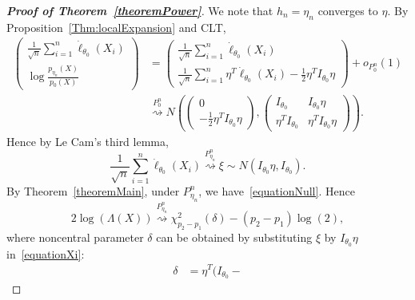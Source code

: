 \documentclass[3p]{elsarticle}
\theoremstyle{plain}
\theoremstyle{definition}
\theoremstyle{remark}
\begin{document}
\begin{proof}[\textbf{Proof of Theorem~\ref{theoremPower}}]
    We note that $h_n=\eta_n$ converges to $\eta$. By Proposition~\ref{Thm:localExpansion} and CLT,
\begin{equation}
    \begin{aligned}
    \left(
    \begin{matrix}
        \frac{1}{\sqrt{n}}\sum^n_{i=1}\dot{\ell}_{\theta_0}(X_i)
        \\
        \log \frac{p_{\eta_n}(X)}{p_0(X)}
    \end{matrix}
    \right)
    &=\left(
        \begin{matrix}
        \frac{1}{\sqrt{n}}\sum^n_{i=1}\dot{\ell}_{\theta_0}(X_i)
        \\
        \frac{1}{\sqrt{n}}\sum^n_{i=1}\eta^T\dot{\ell}_{\theta_0}(X_i)-\frac{1}{2}\eta^T I_{\theta_0}\eta
        \end{matrix}
    \right)
    +o_{P_0^n}(1)\\
    &\overset{P_0^n}{\rightsquigarrow}
    N(
    \left(
    \begin{matrix}
        0\\
        -\frac{1}{2}\eta^T I_{\theta_0}\eta
    \end{matrix}
    \right),
    \left(
        \begin{matrix}
            I_{\theta_0}&I_{\theta_0}\eta\\
            \eta^T I_{\theta_0}&\eta^T I_{\theta_0}\eta
        \end{matrix}
    \right)
    ).
    \end{aligned}
\end{equation}
Hence by Le Cam's third lemma,
\begin{equation}
    \frac{1}{\sqrt{n}}\sum^n_{i=1}\dot{\ell}_{\theta_0}(X_i)\overset{P^n_{\eta_n}}{\rightsquigarrow}\xi\sim N(I_{\theta_0}\eta,I_{\theta_0}).
\end{equation}
By Theorem~\ref{theoremMain}, under $P_{\eta_n}^n$, we have~\eqref{equationNull}.
Hence
\begin{equation}
    2\log(\Lambda(X))\overset{P_{\eta_n}^n}{\rightsquigarrow} \chi^2_{p_2-p_1}(\delta)-(p_2-p_1)\log(2),
\end{equation}
where noncentral parameter $\delta$ can be obtained by substituting $\xi$ by $I_{\theta_0}\eta$ in~\eqref{equationXi}:
\begin{equation}
    \begin{aligned}
        \delta&=\eta^T(
        I_{\theta_0}-

\end{aligned}
\end{equation}
\end{proof}
\end{document}
